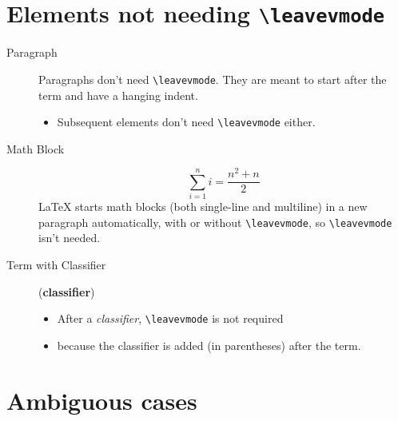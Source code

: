 \documentclass[a4paper]{article}
\begin{document}
\section{Elements not needing \texttt{\textbackslash{}leavevmode}%
  \label{elements-not-needing-leavevmode}%
}

\begin{description}
\item[{Paragraph}] 
Paragraphs don’t need \texttt{\textbackslash{}leavevmode}.  They are meant
to start after the term and have a hanging indent.

\begin{itemize}
\item Subsequent elements don’t need \texttt{\textbackslash{}leavevmode} either.
\end{itemize}

\item[{Math Block}] %
\begin{equation*}
\sum_{i=1}^n i = \frac{n^2+n}{2}
\end{equation*}
LaTeX starts math blocks (both single-line and multiline) in a new
paragraph automatically, with or without \texttt{\textbackslash{}leavevmode}, so
\texttt{\textbackslash{}leavevmode} isn’t needed.

\item[{Term with Classifier}] (\textbf{classifier})
\begin{itemize}
\item After a \emph{classifier}, \texttt{\textbackslash{}leavevmode} is not required

\item because the classifier is added (in parentheses) after the term.
\end{itemize}
\end{description}


\section{Ambiguous cases%
  \label{ambiguous-cases}%
}
\end{document}
